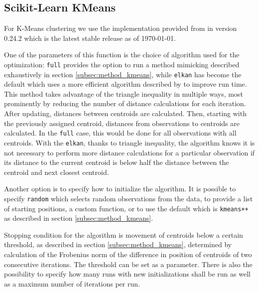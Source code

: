 \subsection{Scikit-Learn KMeans}

For K-Means clustering we use the implementation provided from \cite{sklearn_api} in version 0.24.2 which is the latest stable release as of \today. 

One of the parameters of this function is the choice of algorithm used for the optimization: \texttt{full} provides the option to run a method mimicking \cite{lloyd1982least} described exhaustively in section \ref{subsec:method_kmeans}, while \texttt{elkan} has become the default which uses a more efficient algorithm described by \cite{elkan2003using} to improve run time. This method takes advantage of the triangle inequality in multiple ways, most prominently by reducing the number of distance calculations for each iteration. After updating, distances between centroids are calculated. Then, starting with the previously assigned centroid, distances from observations to centroids are calculated. In the \texttt{full} case, this would be done for all observations with all centroids. With the \texttt{elkan}, thanks to triangle inequality, the algorithm knows it is not necessary to perform more distance calculations for a particular observation if its distance to the current centroid is below half the distance between the centroid and next closest centroid.

Another option is to specify how to initialize the algorithm. It is possible to specify \texttt{random} which selects random observations from the data, to provide a list of starting positions, a custom function, or to use the default which is \texttt{kmeans++} as described in section \ref{subsec:method_kmeans}.

Stopping condition for the algorithm is movement of centroids below a certain threshold, as described in section \ref{subsec:method_kmeans}, determined by calculation of the Frobenius norm of the difference in position of centroids  of two consecutive iterations. The threshold can be set as a parameter. There is also the possibility to specify how many runs with new initializations shall be run as well as a maximum number of iterations per run.

